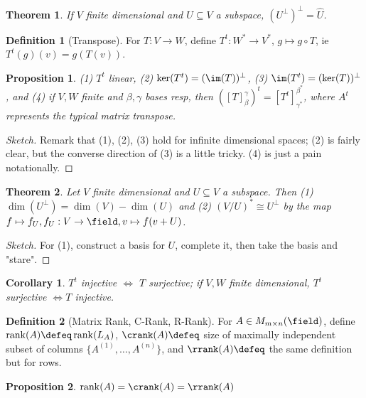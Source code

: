 \documentclass[12pt, oneside]{article}
\theoremstyle{definition}
\newtheorem{defn}{Definition}
\theoremstyle{plain}
\newtheorem{thm}{Theorem}
\newtheorem{cor}{Corollary}
\newtheorem{prop}{Proposition}
\theoremstyle{remark}
\begin{document}
\begin{thm}
  If $V$ finite dimensional and $U \subseteq V$ a subspace, $(U^\perp)^\perp = \hat{U}$.
\end{thm}

\begin{defn}[Transpose]
  For $T : V \to W$, define $T^t : W^\ast \to V^\ast$, $g \mapsto g \circ T$, ie $T^t(g)(v) = g(T(v))$.
\end{defn}
\begin{prop}
  (1) $T^t$ linear, (2) $\ker(T^t) = (\im(T))^\perp$, (3) $\im(T^t) = (\ker(T))^\perp$, and (4) if $V, W$ finite and $\beta, \gamma$ bases resp, then $([T]_\beta^\gamma)^t = [T^t]_{\gamma^\ast}^{\beta^\ast}$, where $A^t$ represents the typical matrix transpose.
\end{prop}

\begin{proof}[Sketch]
Remark that (1), (2), (3) hold for infinite dimensional spaces; (2) is fairly clear, but the converse direction of (3) is a little tricky. (4) is just a pain notationally.
\end{proof}

\begin{thm}
  Let $V$ finite dimensional and $U \subseteq V$ a subspace. Then (1) $\dim(U^\perp) = \dim(V) - \dim(U)$ and (2) $(V/U)^\ast \cong U^\perp$ by the map $f \mapsto f_U, f_U : V \to \field, v \mapsto f(v + U)$.
\end{thm}

\begin{proof}[Sketch]
  For (1), construct a basis for $U$, complete it, then take the basis and "stare".
\end{proof}

\begin{cor}
$T^t$ injective $\iff$ $T$ surjective; if $V, W$ finite dimensional, $T^t$ surjective $\iff T$ injective.   
\end{cor}

\begin{defn}[Matrix Rank, C-Rank, R-Rank]
  For $A \in M_{m \times n}(\field)$, define $\rank(A) \defeq \rank(L_A)$, $\crank(A) \defeq $ size of maximally independent subset of columns $\{A^{(1)}, \dots, A^{(n)}\}$, and $\rrank(A) \defeq$ the same definition but for rows.
\end{defn}

\begin{prop}
  $\rank(A) = \crank(A) = \rrank(A)$
\end{prop}
\end{document}
